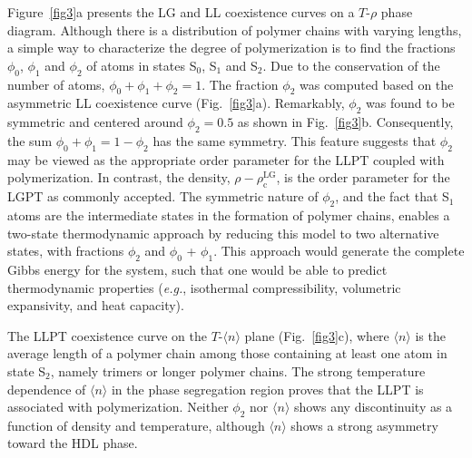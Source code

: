 \documentclass[9pt,twocolumn,twoside,lineno]{pnas-new}
\begin{document}
Figure~\ref{fig3}a presents the LG and LL coexistence curves on a $T$-$\rho$ phase diagram. Although there is a distribution of polymer chains with varying lengths, a simple way to characterize the degree of polymerization is to find the fractions $\phi_0$, $\phi_1$ and $\phi_2$ of atoms in states S$_0$, S$_1$ and S$_2$. Due to the conservation of the number of atoms, $\phi_0+\phi_1+\phi_2 = 1$. The fraction $\phi_2$ was computed based on the asymmetric LL coexistence curve (Fig.~\ref{fig3}a). Remarkably, $\phi_2$ was found to be symmetric and centered around $\phi_2=0.5$ as shown in Fig.~\ref{fig3}b. Consequently, the sum $\phi_0 + \phi_1 = 1-\phi_2$ has the same symmetry. This feature suggests that $\phi_2$ may be viewed as the appropriate order parameter for the LLPT coupled with polymerization. In contrast, the density, $\rho -\rho_\text{c}^\text{LG}$, is the order parameter for the LGPT as commonly accepted. The symmetric nature of $\phi_2$, and the fact that S$_1$ atoms are the intermediate states in the formation of polymer chains, enables a two-state thermodynamic approach \cite{Anisimov2018} by reducing this model to two alternative states, with fractions $\phi_2$ and $\phi_0$ + $\phi_1$. This approach would generate the complete Gibbs energy for the system, such that one would be able to predict thermodynamic properties (\textit{e.g.}, isothermal compressibility, volumetric expansivity, and heat capacity). 

The LLPT coexistence curve on the $T$-$\langle n\rangle$ plane (Fig.~\ref{fig3}c), where $\langle n\rangle$ is the average length of a polymer chain among those containing at least one atom in state S$_2$, namely trimers or longer polymer chains. The strong temperature dependence of $\langle n\rangle$ in the phase segregation region proves that the LLPT is associated with polymerization. Neither $\phi_2$ nor $\langle n\rangle$ shows any discontinuity as a function of density and temperature, although $\langle n\rangle$ shows a strong asymmetry toward the HDL phase. 

\end{document}
